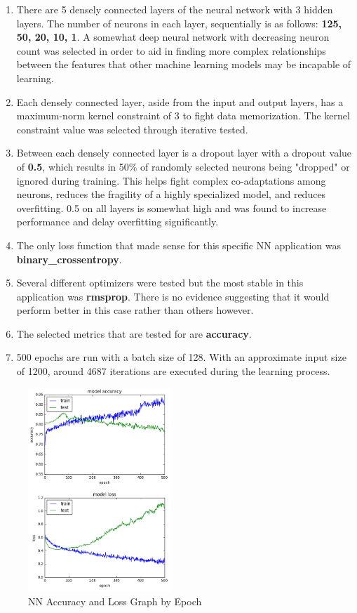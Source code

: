 \documentclass[11pt]{article}
\begin{document}
	\begin{enumerate}
		\item There are 5 densely connected layers of the neural network with 3 hidden layers. The number of neurons in each layer, sequentially is as follows: \textbf{ 125, 50, 20, 10, 1}. A somewhat deep neural network with decreasing neuron count was selected in order to aid in finding more complex relationships between the features that other machine learning models may be incapable of learning.
		\item Each densely connected layer, aside from the input and output layers, has a maximum-norm kernel constraint of 3 to fight data memorization. The kernel constraint value was selected through iterative tested.
		\item Between each densely connected layer is a dropout layer with a dropout value of \textbf{0.5}, which results in 50\% of randomly selected neurons being "dropped" or ignored during training. This helps fight complex co-adaptations among neurons, reduces the fragility of a highly specialized model, and reduces overfitting. 0.5 on all layers is somewhat high and was found to increase performance and delay overfitting significantly.
		\item The only loss function that made sense for this specific NN application was  \textbf{binary\_crossentropy}.
		\item Several different optimizers were tested but the most stable in this application was \textbf{rmsprop}. There is no evidence suggesting that it would perform better in this case rather than others however.
		\item The selected metrics that are tested for are \textbf{accuracy}.
		\item 500 epochs are run with a batch size of 128. With an approximate input size of 1200, around 4687 iterations are executed during the learning process.
	\end{enumerate}

	\begin{figure}
		\begin{center}
			\includegraphics[width=0.48\textwidth]{ml_accuracy_loss.png}
		\end{center}
		\caption{NN Accuracy and Loss Graph by Epoch}
	\end{figure}
\end{document}
